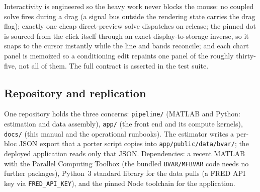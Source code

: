 \documentclass[11pt]{article}
\theoremstyle{plain}
\theoremstyle{remark}
\begin{document}
Interactivity is engineered so the heavy work never blocks the mouse:
no coupled solve fires during a drag (a signal bus outside the rendering
state carries the drag flag); exactly one cheap direct-preview solve
dispatches on release; the pinned dot is sourced from the click itself
through an exact display-to-storage inverse, so it snaps to the cursor
instantly while the line and bands reconcile; and each chart panel is
memoized so a conditioning edit repaints one panel of the roughly
thirty-five, not all of them. The full contract is asserted in the test
suite.

\subsection{Repository and replication}\label{sec:repro}

One repository holds the three concerns: \texttt{pipeline/} (MATLAB and
Python: estimation and data assembly), \texttt{app/} (the front end and
its compute kernels), \texttt{docs/} (this manual and the operational
runbooks). The estimator writes a per-bloc JSON export that a porter
script copies into \texttt{app/public/data/bvar/}; the deployed
application reads only that JSON. Dependencies: a recent MATLAB with the
Parallel Computing Toolbox (the bundled \texttt{BVAR/MFBVAR} code needs
no further packages), Python~3 standard library for the data pulls
(a FRED API key via \texttt{FRED\_API\_KEY}), and the pinned Node
toolchain for the application.
\end{document}
